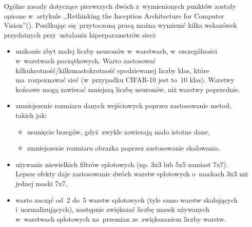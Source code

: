 Ogólne zasady dotyczące pierwszych dwóch z~wymienionych punktów zostały opisane w~artykule
,,Rethinking the Inception Architecture for Computer Vision''(\cite{RIACV}). Posiłkując się~przytoczoną pracą można
wymienić kilka wskazówek przydatnych przy~ustalaniu hiperparametrów sieci:
\begin{itemize}
    \item unikanie zbyt małej liczby neuronów w~warstwach, w~szczególności w~warstwach początkowych. Warto zastosować
          kilkukrotność/kilkunastokrotność spodziewanej liczby klas, które ma~rozpoznawać sieć
          (w~przypadku CIFAR-10 jest to~10 klas). Warstwy końcowe mogą zawierać mniejszą liczbę neuronów, niż warstwy
          poprzednie.
    \item zmniejszenie rozmiaru danych wejściowych poprzez zastosowanie metod, takich jak:
          \begin{itemize}
              \item usunięcie brzegów, gdyż~zwykle zawierają mało istotne dane,
              \item zmniejszenie rozmiaru obrazka poprzez zastosowanie skalowania.
          \end{itemize}
    \item używanie niewielkich filtrów splotowych (np. 3x3 lub 5x5 zamiast 7x7). Lepsze efekty daje zastosowanie dwóch
          warstw splotowych o~maskach 3x3 niż jednej maski 7x7,
    \item warto zacząć od~2 do~5 warstw splotowych (tyle samo warstw skalujących i~normalizujących), następnie zwiększać
          liczbę masek używanych w~warstwach splotowych na~przemian ze~zwiększaniem liczby warstw.
\end{itemize}

